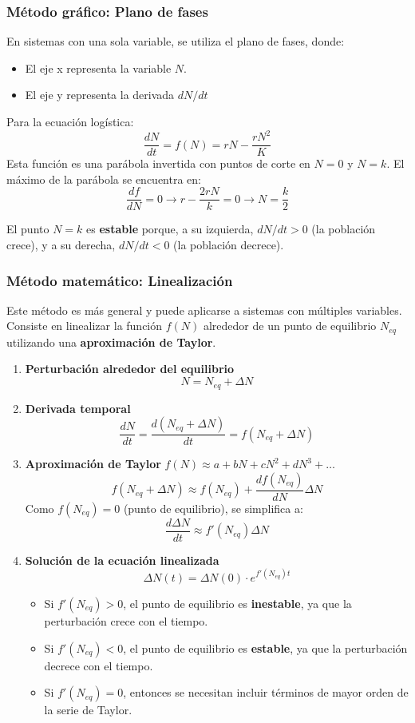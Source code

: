 \subsubsection{Método gráfico: Plano de fases}
En sistemas con una sola variable, se utiliza el plano de fases, donde:
\begin{itemize}
\item El eje x representa la variable $N$.
\item El eje y representa la derivada $dN/dt$
\end{itemize}
Para la ecuación logística:
$$\frac{dN}{dt} = f(N) = rN - \frac{rN^2}{K}$$ 
Esta función es una parábola invertida con puntos de corte en $N = 0$ y $N = k$. El máximo de la parábola se encuentra en:
$$\frac{df}{dN} = 0 \rightarrow r - \frac{2rN}{k} = 0 \rightarrow N = \frac{k}{2}$$

El punto $N = k$ es \textbf{estable} porque, a su izquierda, $dN/dt > 0$ (la población crece), y a su derecha, $dN/dt < 0$ (la población decrece).

\subsubsection{Método matemático: Linealización}
Este método es más general y puede aplicarse a sistemas con múltiples variables. Consiste en linealizar la función $f(N)$ alrededor de un punto de equilibrio $N_{eq}$ utilizando una \textbf{aproximación de Taylor}.
\begin{enumerate}
\item \textbf{Perturbación alrededor del equilibrio}
$$N = N_{eq} + \Delta N$$

\item \textbf{Derivada temporal}
$$\frac{dN}{dt} = \frac{d(N_{eq} + \Delta N)}{dt} = f(N_{eq} + \Delta N)$$

\item \textbf{Aproximación de Taylor} $f(N) \approx a + bN + cN^2 + dN^3 + \ldots$
$$f(N_{eq} + \Delta N) \approx f(N_{eq}) + \frac{df(N_{eq})}{dN} \Delta N$$
Como $f(N_{eq}) = 0$ (punto de equilibrio), se simplifica a:
$$\frac{d \Delta N}{dt} \approx f'(N_{eq}) \Delta N$$

\item \textbf{Solución de la ecuación linealizada}
$$\Delta N(t) = \Delta N(0) \cdot e^{f'(N_{eq})t}$$
\begin{itemize}
\item Si $f'(N_{eq}) > 0$, el punto de equilibrio es \textbf{inestable}, ya que la perturbación crece con el tiempo.
\item Si $f'(N_{eq}) < 0$, el punto de equilibrio es \textbf{estable}, ya que la perturbación decrece con el tiempo.
\item Si $f'(N_{eq}) = 0$, entonces se necesitan incluir términos de mayor orden de la serie de Taylor. 
\end{itemize}
\end{enumerate}

